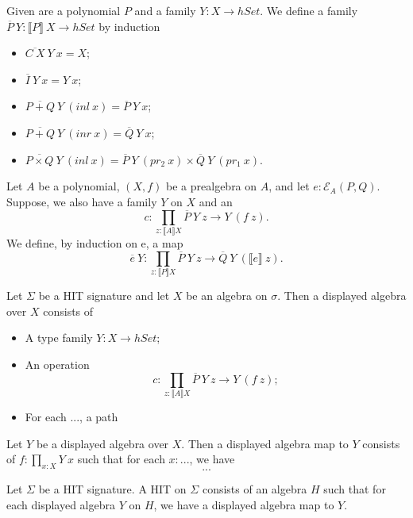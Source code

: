 \documentclass[9pt]{entcs}
\newcommand{\type}[1]{#1}
\newcommand{\term}[1]{#1}
\newcommand{\constructor}[1]{#1}
\newcommand{\deprod}[3]{\prod_{#1 : #2} #3}
\newcommand{\hset}{\type{hSet}} %
\newcommand{\1}{\type{1}} %
\newcommand{\inl}{\term{inl}} %
\newcommand{\inr}{\term{inr}} %
\newcommand{\prl}{\term{pr}_1} %
\newcommand{\prr}{\term{pr}_2} %
\newcommand{\C}{\constructor{C}} %
\newcommand{\I}{\constructor{I}} %
\newcommand{\sumP}[2]{#1 + #2} %
\newcommand{\prodP}[2]{#1 \times #2} %
\newcommand{\ep}[3]{\mathcal{E}_{#1}(#2,#3)} %
\newcommand{\semP}[1]{\llbracket #1 \rrbracket} %
\newcommand{\semE}[1]{\llbracket #1 \rrbracket} %
\newcommand{\polydact}[2]{\overline{#1} \> #2}
\newcommand{\epdact}[2]{\overline{#1} \> Y}
\begin{document}
\begin{definition}
Given are a polynomial $P$ and a family $Y : X \rightarrow \hset$.
We define a family $\polydact{P}{Y} : \semP{P} \> X \rightarrow \hset$ by induction
\begin{itemize}
	\item $\polydact{\C \> X}{Y} \> x = X$;
	\item $\polydact{\I}{Y} \> x = Y \> x$;
	\item $\polydact{\sumP{P}{Q}}{Y} \> (\inl \> x) = \polydact{P}{Y} \> x$;
	\item $\polydact{\sumP{P}{Q}}{Y} \> (\inr \> x) = \polydact{Q}{Y} \> x$;
	\item $\polydact{\prodP{P}{Q}}{Y} \> (\inl \> x) = \polydact{P}{Y} \> (\prr \> x) \times \polydact{Q}{Y} \> (\prl \> x)$.
\end{itemize}
\end{definition}

\begin{definition}
Let $A$ be a polynomial, $(X , f)$ be a prealgebra on $A$, and let $e : \ep{A}{P}{Q}$.
Suppose, we also have a family $Y$ on $X$ and an
\[
c : \deprod{z}{\semP{A}{X}}{\polydact{P}{Y} \> z \rightarrow Y \> (f \> z)}.
\]
We define, by induction on e, a map
\[
\epdact{e}{Y} : \deprod{z}{\semP{P}{X}}{\polydact{P}{Y} \> z \rightarrow \polydact{Q}{Y} \> (\semE{e} \> z)}.
\]
\end{definition}

\begin{definition}
Let $\Sigma$ be a HIT signature and let $X$ be an algebra on $\sigma$.
Then a displayed algebra over $X$ consists of
\begin{itemize}
	\item A type family $Y : X \rightarrow \hset$;
	\item An operation 
	\[
	c : \deprod{z}{\semP{A}{X}}{\polydact{P}{Y} \> z \rightarrow Y \> (f \> z)};
	\]
	\item For each ..., a path
	\[
	\]
\end{itemize} 
\end{definition}

\begin{definition}
Let $Y$ be a displayed algebra over $X$.
Then a displayed algebra map to $Y$ consists of $f : \deprod{x}{X}{Y \> x}$ such that for each $x : ...$, we have
\[
...
\]
\end{definition}

\begin{definition}
Let $\Sigma$ be a HIT signature.
A HIT on $\Sigma$ consists of an algebra $H$ such that for each displayed algebra $Y$ on $H$, we have a displayed algebra map to $Y$.
\end{definition}
\end{document}
